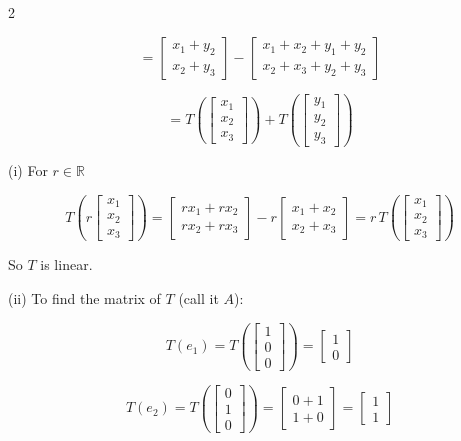 \documentclass[8pt]{extarticle}
\begin{document}
\begin{multicols}{2}
\begin{tcolorbox}[title=Problem 1 — Original Statement and Solution]
\begin{enumerate}
\[
= \begin{bmatrix} x_{1}+y_{2}\\ x_{2}+y_{3} \end{bmatrix}
- \begin{bmatrix} x_{1}+x_{2}+y_{1}+y_{2}\\ x_{2}+x_{3}+y_{2}+y_{3} \end{bmatrix}
\]

\[
= T\!\left(\begin{bmatrix} x_{1}\\ x_{2}\\ x_{3} \end{bmatrix}\right)
+ T\!\left(\begin{bmatrix} y_{1}\\ y_{2}\\ y_{3} \end{bmatrix}\right)
\]

\medskip
(i) For $r \in \mathbb{R}$

\[
T\!\left(r\begin{bmatrix} x_{1}\\ x_{2}\\ x_{3} \end{bmatrix}\right)
= \begin{bmatrix} r x_{1}+r x_{2}\\ r x_{2}+r x_{3} \end{bmatrix}
- r \begin{bmatrix} x_{1}+x_{2}\\ x_{2}+x_{3} \end{bmatrix}
= r \, T\!\left(\begin{bmatrix} x_{1}\\ x_{2}\\ x_{3} \end{bmatrix}\right)
\]

So $T$ is linear.

\bigskip
(ii) To find the matrix of $T$ (call it $A$):

\[
T(e_{1}) = T\!\left(\begin{bmatrix}1\\0\\0\end{bmatrix}\right)
= \begin{bmatrix}1\\0\end{bmatrix}
\]

\[
T(e_{2}) = T\!\left(\begin{bmatrix}0\\1\\0\end{bmatrix}\right)
= \begin{bmatrix}0+1\\1+0\end{bmatrix}
= \begin{bmatrix}1\\1\end{bmatrix}
\]


\end{enumerate}
\end{tcolorbox}
\end{multicols}
\end{document}
